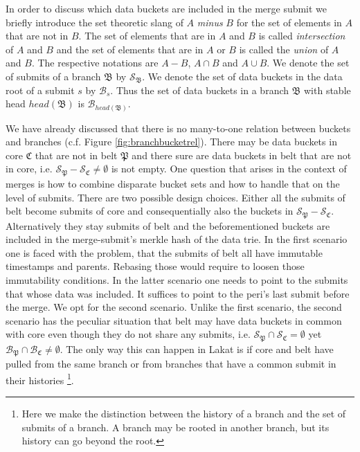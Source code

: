 \documentclass[14pt]{article}
\begin{document}
In order to discuss which data buckets are included in the merge submit we briefly introduce the set theoretic slang of $A$ \textit{minus} $B$ for the set of elements in $A$ that are not in $B$. The set of elements that are in $A$ and $B$ is called \textit{intersection} of $A$ and $B$ and the set of elements that are in $A$ or $B$ is called the \textit{union} of $A$ and $B$. The respective notations are $A-B$, $A\cap B$ and $A\cup B$. We denote the set of submits of a branch $\mathfrak B$ by $\mathcal S_{\mathfrak B}$. We denote the set of data buckets in the data root of a submit $s$ by $\mathcal{B}_s$. Thus the set of data buckets in a branch $\mathfrak B$ with stable head $head(\mathfrak B)$ is $\mathcal{B}_{head(\mathfrak B)}$. 

We have already discussed that there is no many-to-one relation between buckets and branches (c.f. Figure \ref{fig:branchbucketrel}). There may be data buckets in core $\mathfrak C$ that are not in belt $\mathfrak P$ and there sure are data buckets in belt that are not in core, i.e. $\mathcal S_{\mathfrak P}-\mathcal S_{\mathfrak C}\neq \emptyset$ is not empty. 
One question that arises in the context of merges is how to combine disparate bucket sets and how to handle that on the level of submits. There are two possible design choices. Either all the submits of belt become submits of core and consequentially also the buckets in $\mathcal S_{\mathfrak P}-\mathcal S_{\mathfrak C}$. Alternatively they stay submits of belt and the beforementioned buckets are included in the merge-submit's merkle hash of the data trie. In the first scenario one is faced with the problem, that the submits of belt all have immutable timestamps and parents. Rebasing those would require to loosen those immutability conditions. In the latter scenario one needs to point to the submits that whose data was included. It suffices to point to the peri's last submit before the merge. We opt for the second scenario. Unlike the first scenario, the second scenario has the peculiar situation that belt may have data buckets in common with core even though they do not share any submits, i.e. $\mathcal S_{\mathfrak P}\cap\mathcal S_{\mathfrak C}= \emptyset$ yet $\mathcal B_{\mathfrak P}\cap\mathcal B_{\mathfrak C}\neq \emptyset$. The only way this can happen in Lakat is if core and belt have pulled from the same branch or from branches that have a common submit in their histories \footnote{Here we make the distinction between the history of a branch and the set of submits of a branch. A branch may be rooted in another branch, but its history can go beyond the root.}. 
\end{document}
